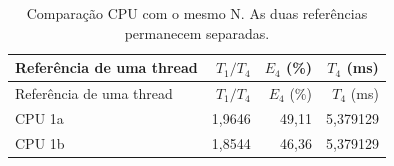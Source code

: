 \begin{longtable}{lrrr}
\caption{Comparação CPU com o mesmo N. As duas referências permanecem separadas.}\label{tab:cpu}\\
\toprule Referência de uma thread & $T_1/T_4$ & $E_4$ (\%) & $T_4$ (ms)\\
\midrule\endfirsthead
\toprule Referência de uma thread & $T_1/T_4$ & $E_4$ (\%) & $T_4$ (ms)\\
\midrule\endhead
\bottomrule\endfoot
CPU 1a & 1,9646 & 49,11 & 5,379129\\
CPU 1b & 1,8544 & 46,36 & 5,379129\\
\end{longtable}
